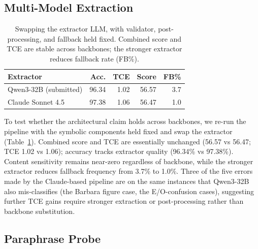 \documentclass[11pt]{article}
\begin{document}
\subsection{Multi-Model Extraction}
\label{sec:multi-model}

\begin{table}[t]
\centering
\small
\setlength{\tabcolsep}{4pt}
\begin{tabular}{@{}lrrrr@{}}
\toprule
\textbf{Extractor} & \textbf{Acc.} & \textbf{TCE} & \textbf{Score} & \textbf{FB\%} \\
\midrule
Qwen3-32B (submitted) & 96.34 & 1.02 & 56.57 & 3.7 \\
Claude Sonnet 4.5     & 97.38 & 1.06 & 56.47 & 1.0 \\
\bottomrule
\end{tabular}
\caption{Swapping the extractor LLM, with validator, post-processing, and fallback held fixed. Combined score and TCE are stable across backbones; the stronger extractor reduces fallback rate (FB\%).}
\label{tab:multi-model}
\end{table}

To test whether the architectural claim holds across backbones, we re-run the pipeline with the symbolic components held fixed and swap the extractor (Table~\ref{tab:multi-model}). Combined score and TCE are essentially unchanged (56.57 vs 56.47; TCE 1.02 vs 1.06); accuracy tracks extractor quality (96.34\% vs 97.38\%). Content sensitivity remains near-zero regardless of backbone, while the stronger extractor reduces fallback frequency from 3.7\% to 1.0\%. Three of the five errors made by the Claude-based pipeline are on the same instances that Qwen3-32B also mis-classifies (the Barbara figure case, the E/O-confusion cases), suggesting further TCE gains require stronger extraction or post-processing rather than backbone substitution.

\subsection{Paraphrase Probe}
\label{sec:paraphrase}
\end{document}

